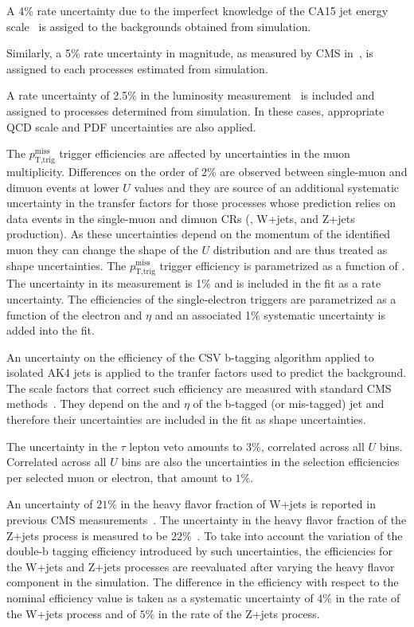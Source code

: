 A 4\% rate uncertainty due to the imperfect knowledge of the CA15 jet energy scale~\cite{jec} is assiged to the backgrounds obtained from simulation.

Similarly, a 5\% rate uncertainty in \ptmiss magnitude, as measured by CMS in~\cite{Khachatryan:2014gga}, is assigned to each processes estimated from simulation.

A rate uncertainty of 2.5\% in the luminosity measurement~\cite{CMS-PAS-LUM-17-001} is included and assigned to processes determined from simulation. In these cases, appropriate QCD scale and PDF uncertainties are also applied.

The $p_\text{T,trig}^\text{miss}$ trigger efficiencies are affected by uncertainties in the muon multiplicity.  Differences on the order of 2\% are observed between single-muon and dimuon events at lower $U$ values and they are source of an additional systematic uncertainty in the transfer factors for those processes whose prediction relies on data events in the single-muon and
dimuon CRs (\ttbar, W+jets, and Z+jets production). As these uncertainties depend on the momentum of the identified muon they can change the shape of the $U$ distribution and are thus treated as shape uncertainties. The $p_\text{T,trig}^\text{miss}$ trigger efficiency is parametrized as a function of \ptmiss. The uncertainty in its measurement is 1\% and is included in the fit as a rate uncertainty.
The efficiencies of the single-electron triggers are parametrized as a function of the electron \pt and $\eta$ and an associated 1\% systematic uncertainty is added into the fit.

An uncertainty on the efficiency of the CSV b-tagging algorithm applied to isolated AK4 jets is applied to the tranfer factors used to predict the \ttbar background. The scale factors that correct such efficiency are measured with standard CMS methods~\cite{Sirunyan:2017ezt}. They depend on the \pt and $\eta$ of the b-tagged (or mis-tagged) jet and therefore their uncertainties are included in the fit as shape uncertainties.

The uncertainty in the $\tau$ lepton veto amounts to $3\%$, correlated across all $U$ bins. Correlated across all $U$ bins are also the uncertainties in the selection efficiencies per selected muon or electron, that amount to $1\%$.

An uncertainty of $21\%$ in the heavy flavor fraction of W+jets is reported in previous CMS measurements~\cite{Khachatryan:2014uva,Chatrchyan:2013uza}. The uncertainty in the heavy flavor fraction of the Z+jets process is measured to be $22\%$~\cite{Khachatryan:2014zya,Chatrchyan:2014dha}. To take into account the variation of the double-b tagging efficiency introduced by such uncertainties, the efficiencies for the W+jets and Z+jets processes are reevaluated after varying the heavy flavor component in the simulation. The difference in the efficiency with respect to the nominal efficiency value is taken as a systematic uncertainty of $4\%$ in the rate of the W+jets process and of $5\%$ in the rate of the Z+jets process. 

